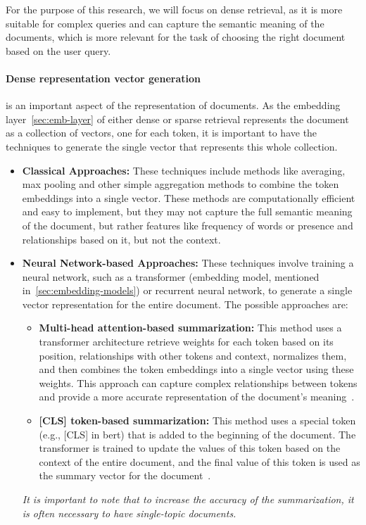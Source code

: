 For the purpose of this research, we will focus on dense retrieval, as it is
more suitable for complex queries and can capture the semantic meaning of the
documents, which is more relevant for the task of choosing the right document
based on the user query.

\paragraph{Dense representation vector generation}
is an important aspect of the representation of documents. As the embedding
layer~\ref{sec:emb-layer} of either dense or sparse retrieval represents the
document as a collection of vectors, one for each token, it is important to have
the techniques to generate the single vector that represents this whole
collection.

\begin{itemize}
  \item \textbf{Classical Approaches:} These techniques include
    methods like averaging, max pooling and other simple
    aggregation methods to combine the token embeddings into a
    single vector. These methods are computationally efficient
    and easy to implement, but they may not capture the full
    semantic meaning of the document, but rather features like
    frequency of words or presence and relationships based on it,
    but not the context.
  \item \textbf{Neural Network-based Approaches:} These techniques involve
    training a neural network, such as a transformer (embedding
    model, mentioned in~\ref{sec:embedding-models}) or recurrent
    neural network, to generate a single vector representation for
    the entire document. The possible approaches are:
    \begin{itemize}
      \item \textbf{Multi-head attention-based summarization:} This method
        uses a transformer architecture retrieve weights for each token
        based on its position, relationships with other tokens and
        context, normalizes them, and then combines the token
        embeddings into a single vector using these weights. This
        approach can capture complex relationships between tokens and
        provide a more accurate representation of the document's
        meaning~\cite{sharma2024unmacapsumtunifiedmultiheadattentiondriven}.
      \item \textbf{[CLS] token-based summarization:} This method uses a
        special token (e.g., [CLS] in \gls{bert}) that is added to the
        beginning of the document. The transformer is trained to update
        the values of this token based on the context of the entire
        document, and the final value of this token is used as the
        summary vector for the
        document~\cite{behrendt2025maxpoolbertenhancingbertclassification,devlin2018bert}.
    \end{itemize}
    \textsl{It is important to note that to increase the accuracy of the
    summarization, it is often necessary to have single-topic documents.}
\end{itemize}

